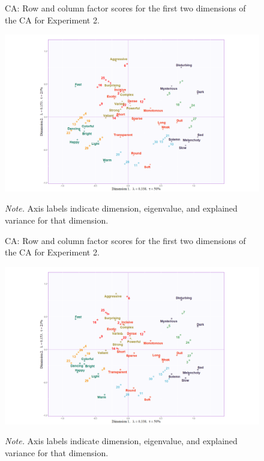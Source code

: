 \documentclass[
]{article}
\begin{document}
\begin{figure}   
  \centering  
  \caption{CA: Row and column factor scores for the first two dimensions of the CA for Experiment 2.}
    \includegraphics{./supmatsimgs/asym.png}
  \label{fig:asym}
  \caption*{\footnotesize \textit{Note.} Axis labels indicate dimension, eigenvalue, and explained variance for that dimension.}
\end{figure}

\begin{figure}   
  \centering  
  \caption{CA: Row and column factor scores for the first two dimensions of the CA for Experiment 2.}
    \includegraphics{./supmatsimgs/asymrepel.png}
  \label{fig:asymrepel}
  \caption*{\footnotesize \textit{Note.} Axis labels indicate dimension, eigenvalue, and explained variance for that dimension.}
\end{figure}
\end{document}
